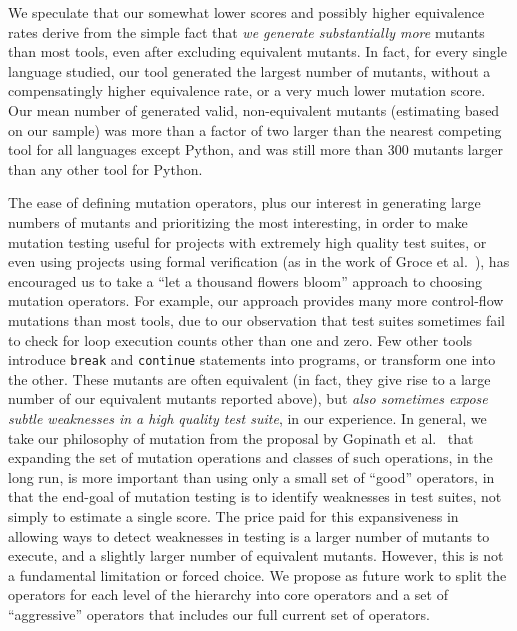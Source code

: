 \documentclass[acmsmall]{acmart}
\begin{document}
{We speculate that our somewhat lower scores and possibly higher
equivalence rates derive from the simple fact that \emph{we generate
substantially more}
mutants than most tools, even after excluding equivalent mutants.  In fact, for every single language studied,
our tool generated the largest number of mutants, without a
compensatingly higher equivalence rate, or a very much lower
mutation score.  Our mean number of generated valid, non-equivalent
mutants (estimating based on our sample) was more than a factor of
two larger than the nearest competing tool for all languages except
Python, and was still more than 300 mutants larger than any other
tool for Python.

The ease of defining mutation operators,
plus our interest in generating large numbers of mutants and
prioritizing the most interesting, in order to make mutation testing useful for
projects with extremely high quality test suites, or even using
projects using formal
verification (as in the work of Groce et al.~\cite{groce2018verified}), has encouraged us to take a ``let a thousand flowers bloom''
approach to choosing mutation operators.  For example, our approach
provides many more control-flow mutations than most tools, due to our
observation that test suites sometimes fail to check for loop
execution counts other than one and zero.  Few other tools introduce
{\tt break} and {\tt continue} statements into programs, or transform
one into the other.  These mutants are often equivalent (in fact, they
give rise to a large number of our equivalent mutants reported above), but \emph{also
sometimes expose subtle weaknesses in a high quality test suite}, in our
experience.  In general, we take our philosophy of mutation from the
proposal by Gopinath et al.~\cite{Limits,gopinath2017mutation} that
expanding the set of mutation operations and classes of such
operations, in the long run, is more important than using only a small
set of ``good'' operators, in that the end-goal of mutation testing is
to identify weaknesses in test suites, not simply to estimate a single
score.   The price paid for this
expansiveness in allowing ways to detect weaknesses in testing is a
larger number of mutants to execute, and a slightly larger number of
equivalent mutants.  However, this is not a
fundamental limitation or forced choice.  We propose as future work to
split the operators for each level of the hierarchy into
core operators and a set of ``aggressive'' operators
that includes our full current set of operators.

}
\end{document}

